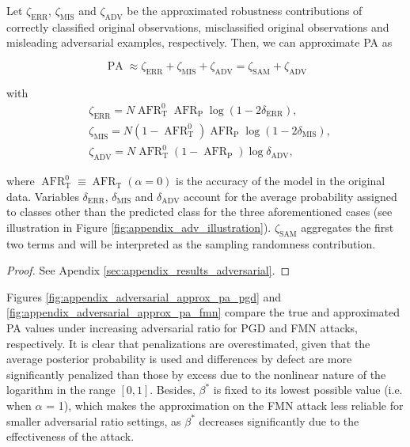 \begin{proposition}
    Let $\zeta_{\text{ERR}}$, $\zeta_{\text{MIS}}$ and $\zeta_{\text{ADV}}$ be the approximated robustness
    contributions of correctly classified original observations, misclassified original observations
    and misleading adversarial examples, respectively. Then, we can approximate PA as

    $$
    \operatorname{PA} \approx \zeta_{\text{ERR}} + \zeta_{\text{MIS}} + \zeta_{\text{ADV}} = \zeta_{\text{SAM}} + \zeta_{\text{ADV}} 
    $$

    with
    $$
    \begin{aligned}
        &\zeta_{\text{ERR}} = N \operatorname{AFR}_\text{T}^0 \operatorname{AFR}_\text{P} \log \left( 1 - 2\delta_{\text{ERR}} \right), \\
        &\zeta_{\text{MIS}} = N (1- \operatorname{AFR}_\text{T}^0) \operatorname{AFR}_\text{P} \log \left( 1 - 2\delta_{\text{MIS}} \right), \\
        &\zeta_{\text{ADV}} = N \operatorname{AFR}_\text{T}^0 (1 - \operatorname{AFR}_\text{P}) \log \delta_{\text{ADV}},
    \end{aligned}
    $$

    where $\operatorname{AFR}_\text{T}^0 \equiv \operatorname{AFR}_\text{T}(\alpha=0)$ is the accuracy of the model in the original data.
    Variables $\delta_{\text{ERR}}$, $\delta_{\text{MIS}}$ and $\delta_{\text{ADV}}$ account for the 
    average probability assigned to
    classes other than the predicted class for the three aforementioned cases 
    (see illustration in Figure \ref{fig:appendix_adv_illustration}). $\zeta_{\text{SAM}}$ aggregates
    the first two terms and will be interpreted as the sampling randomness contribution.
\end{proposition}
\begin{proof}
    See Apendix \ref{sec:appendix_results_adversarial}.
\end{proof}

Figures \ref{fig:appendix_adversarial_approx_pa_pgd} and \ref{fig:appendix_adversarial_approx_pa_fmn}
compare the true and approximated PA values under increasing adversarial ratio for
PGD and FMN attacks, respectively. It is clear that penalizations are overestimated, 
given that the average posterior probability is used and differences by defect are more 
significantly penalized than those by excess due to the nonlinear nature of the logarithm in 
the range $[0,1]$. Besides, $\beta^{*}$ is fixed to its lowest possible value (i.e. when $\alpha$ = 1),
which makes the approximation on the FMN attack less reliable for smaller adversarial 
ratio settings, as $\beta^{*}$ decreases significantly due to the effectiveness of the attack. \\

